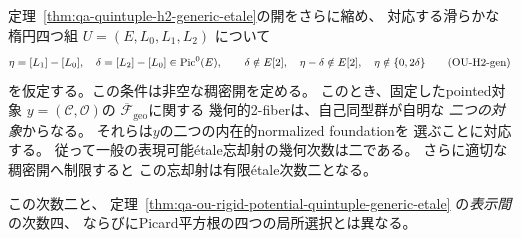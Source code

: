 \begin{corollary}[一般pointed忘却の幾何次数は二]
\label{cor:qa-quintuple-h2-generic-degree-two}
定理~\ref{thm:qa-quintuple-h2-generic-etale}の開をさらに縮め、
対応する滑らかな楕円四つ組
$U=(E,L_0,L_1,L_2)$ について
\[
 \eta=[L_1]-[L_0],\quad
 \delta=[L_2]-[L_0]\in\operatorname{Pic}^0(E),\qquad
 \delta\notin E[2],\quad
 \eta-\delta\notin E[2],\quad
 \eta\notin\{0,2\delta\}
 \tag{OU-H2-gen}\label{eq:qa-ou-h2-two-rulings-open}
\]
を仮定する。この条件は非空な稠密開を定める。
このとき、固定したpointed対象
$y=(\mathcal C,\mathcal O)$の
$\overline{\mathcal F}_{\mathrm{geo}}$に関する
幾何的2-fiberは、自己同型群が自明な
\emph{二つの対象}からなる。
それらは$y$の二つの内在的normalized foundationを
選ぶことに対応する。
従って一般の表現可能étale忘却射の幾何次数は二である。
さらに適切な稠密開へ制限すると
この忘却射は有限étale次数二となる。

この次数二と、
定理~\ref{thm:qa-ou-rigid-potential-quintuple-generic-etale}
の\emph{表示間}の次数四、
ならびにPicard平方根の四つの局所選択とは異なる。
\end{corollary}
